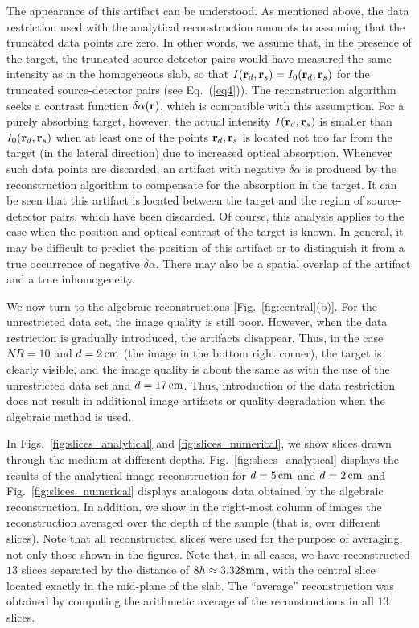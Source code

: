 The appearance of this artifact can be understood. As mentioned above, the data restriction used with the analytical reconstruction amounts to assuming that the truncated data points are zero. In other words, we assume that, in the presence of the target, the truncated source-detector pairs would have measured the same intensity as in the homogeneous slab, so that $I({\bf r}_d,{\bf r}_s) = I_0({\bf r}_d,{\bf r}_s)$ for the truncated source-detector pairs (see Eq.~(\ref{eq4})). The reconstruction algorithm seeks a contrast function $\delta\alpha({\bf r})$, which is compatible with this assumption.  For a purely absorbing target, however, the actual intensity $I({\bf r}_d,{\bf r}_s)$ is smaller than $I_0({\bf r}_d,{\bf r}_s)$ when at least one of the points ${\bf r}_d,{\bf r}_s$ is located not too far from the target (in the lateral direction) due to increased optical absorption. Whenever such data points are discarded, an artifact with negative $\delta\alpha$ is produced by the reconstruction algorithm to compensate for the absorption in the target. It can be seen that this artifact is located between the
target and the region of source-detector pairs, which have been discarded. Of course, this analysis applies to the case when the position and optical contrast of the target is known.  In general, it
may be difficult to predict the position of this artifact or to distinguish it from a true occurrence of negative $\delta\alpha$. There may also be a spatial overlap of the artifact and a true inhomogeneity.

We now turn to the algebraic reconstructions [Fig.~\ref{fig:central}(b)]. For the unrestricted data set, the image quality is still poor. However, when the data restriction is gradually introduced, the artifacts disappear.  Thus, in the case $NR=10$ and $d=2\,{\rm cm}$ (the image in the bottom right corner), the target is clearly visible, and the image quality is about the same as with the
use of the unrestricted data set and $d=17\,{\rm cm}$. Thus, introduction of the data restriction does not result in additional image artifacts or quality degradation when the algebraic method is
used.

In Figs.~\ref{fig:slices_analytical} and \ref{fig:slices_numerical}, we show slices drawn through the medium at different depths. Fig.~\ref{fig:slices_analytical} displays the results of the analytical image reconstruction for $d=5\,{\rm cm}$ and $d=2\,{\rm cm}$ and Fig.~\ref{fig:slices_numerical} displays analogous data obtained by the algebraic reconstruction. In addition, we show in the right-most column of images the reconstruction averaged over the depth of the sample (that is, over different slices). Note that all reconstructed slices were used for the purpose of averaging, not only those shown in the figures. Note that, in all cases, we have reconstructed $13$ slices separated by the distance of  $8h\approx 3.328{\rm mm}$, with the central slice located exactly in the mid-plane of the slab. The ``average'' reconstruction was obtained by computing the arithmetic average of the reconstructions in all $13$ slices.

